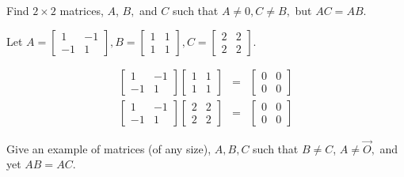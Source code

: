 \documentclass{ximera}
\begin{document}
\begin{problem}\label{prb:4.16} Find $2\times 2$ matrices, $A$, $B,$ and $C$ such that $A\neq 0,C\neq B,$
but $AC=AB.$
\begin{hint}
Let $A = \left[
\begin{array}{rr}
1 & -1 \\
-1 & 1
\end{array}
\right], B = \left[
\begin{array}{cc}
1 & 1 \\
1 & 1
\end{array}
\right], C = \left[
\begin{array}{cc}
2 & 2 \\
2 & 2
\end{array}
\right]$.

\begin{eqnarray*}
\left[
\begin{array}{rr}
1 & -1 \\
-1 & 1
\end{array}
\right] \left[
\begin{array}{cc}
1 & 1 \\
1 & 1
\end{array}
\right]  &=& \left[
\begin{array}{cc}
0 & 0 \\
0 & 0
\end{array}
\right] \\
 \left[
\begin{array}{rr}
1 & -1 \\
-1 & 1
\end{array}
\right] \left[
\begin{array}{cc}
2 & 2 \\
2 & 2
\end{array}
\right] &=& \left[
\begin{array}{cc}
0 & 0 \\
0 & 0
\end{array}
\right]
\end{eqnarray*}
\end{hint}
\end{problem}

\begin{problem}\label{prb:4.17} Give an example of matrices (of any size), $A,B,C$ such that $B\neq C$, $A\neq \vec{O},$
and yet $AB=AC.$
\end{problem}
\end{document}
